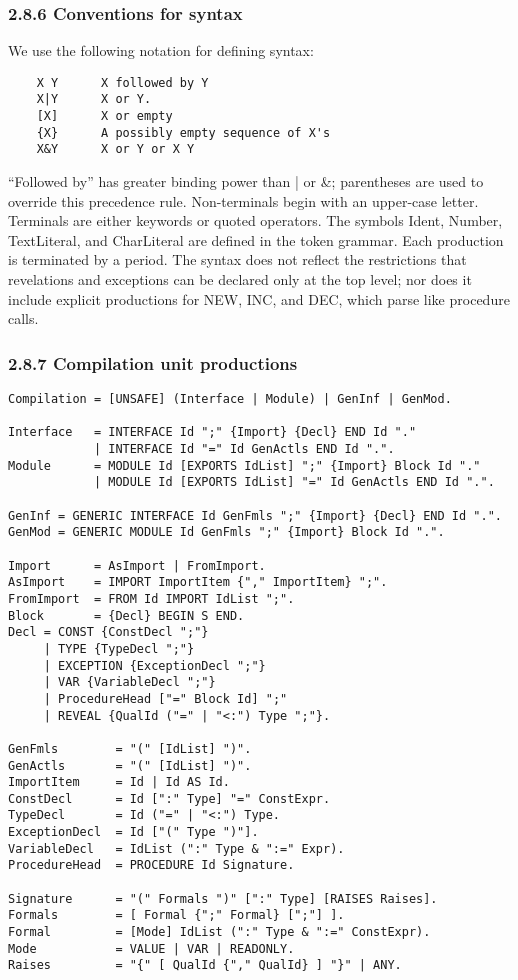 \documentclass[10pt]{article}
\begin{document}
\subsubsection*{2.8.6 Conventions for syntax}

We use the following notation for defining syntax:
\begin{verbatim}
    X Y      X followed by Y
    X|Y      X or Y.
    [X]      X or empty
    {X}      A possibly empty sequence of X's
    X&Y      X or Y or X Y
\end{verbatim}
``Followed by'' has greater binding power than | or \&; parentheses are used
to override this precedence rule. Non-terminals begin with an upper-case
letter. Terminals are either keywords or quoted operators. The symbols Ident,
Number, TextLiteral, and CharLiteral are defined in the token grammar. Each
production is terminated by a period. The syntax does not reflect the
restrictions that revelations and exceptions can be declared only at the top
level; nor does it include explicit productions for NEW, INC, and DEC, which
parse like procedure calls.

\subsubsection*{2.8.7 Compilation unit productions}

\begin{verbatim}
Compilation = [UNSAFE] (Interface | Module) | GenInf | GenMod.

Interface   = INTERFACE Id ";" {Import} {Decl} END Id "."
            | INTERFACE Id "=" Id GenActls END Id ".".
Module      = MODULE Id [EXPORTS IdList] ";" {Import} Block Id "."
            | MODULE Id [EXPORTS IdList] "=" Id GenActls END Id ".".

GenInf = GENERIC INTERFACE Id GenFmls ";" {Import} {Decl} END Id ".".
GenMod = GENERIC MODULE Id GenFmls ";" {Import} Block Id ".".

Import      = AsImport | FromImport.
AsImport    = IMPORT ImportItem {"," ImportItem} ";".
FromImport  = FROM Id IMPORT IdList ";".
Block       = {Decl} BEGIN S END.
Decl = CONST {ConstDecl ";"}
     | TYPE {TypeDecl ";"}
     | EXCEPTION {ExceptionDecl ";"}
     | VAR {VariableDecl ";"}
     | ProcedureHead ["=" Block Id] ";"
     | REVEAL {QualId ("=" | "<:") Type ";"}.

GenFmls        = "(" [IdList] ")".
GenActls       = "(" [IdList] ")".
ImportItem     = Id | Id AS Id.
ConstDecl      = Id [":" Type] "=" ConstExpr.
TypeDecl       = Id ("=" | "<:") Type.
ExceptionDecl  = Id ["(" Type ")"].
VariableDecl   = IdList (":" Type & ":=" Expr).
ProcedureHead  = PROCEDURE Id Signature.

Signature      = "(" Formals ")" [":" Type] [RAISES Raises].
Formals        = [ Formal {";" Formal} [";"] ].
Formal         = [Mode] IdList (":" Type & ":=" ConstExpr).
Mode           = VALUE | VAR | READONLY.
Raises         = "{" [ QualId {"," QualId} ] "}" | ANY.
\end{verbatim}
\end{document}
